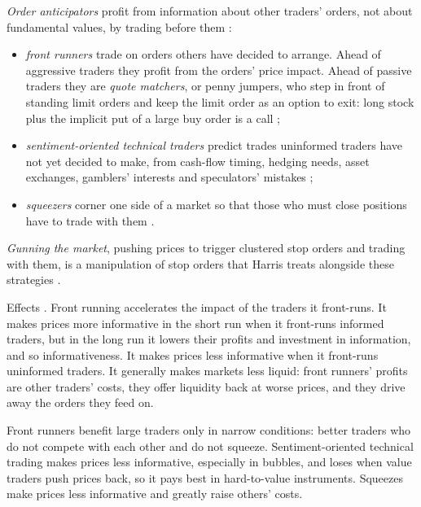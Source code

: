 \begin{qfdefinition}\label{def:order-anticipation}
 \emph{Order anticipators} profit from information about other traders' orders, not about fundamental values, by trading before them \citep[chap.~``Order Anticipators'', pp.~245 and~256--257]{alpha-harris}:
\begin{itemize}
\item \emph{front runners} trade on orders others have decided to arrange. Ahead of aggressive traders they profit from the orders' price impact. Ahead of passive traders they are \emph{quote matchers}, or penny jumpers, who step in front of standing limit orders and keep the limit order as an option to exit: long stock plus the implicit put of a large buy order is a call \citep[sec.~11.1, pp.~245--250]{alpha-harris};
\item \emph{sentiment-oriented technical traders} predict trades uninformed traders have not yet decided to make, from cash-flow timing, hedging needs, asset exchanges, gamblers' interests and speculators' mistakes \citep[sec.~11.2, pp.~251--254]{alpha-harris};
\item \emph{squeezers} corner one side of a market so that those who must close positions have to trade with them \citep[sec.~11.3, pp.~254--256]{alpha-harris}.
\end{itemize}
\emph{Gunning the market}, pushing prices to trigger clustered stop orders and trading with them, is a manipulation of stop orders that Harris treats alongside these strategies \citep[sec.~11.4, p.~256]{alpha-harris}.

 Effects \citep[same chap., secs.~11.1.3--11.1.4, 11.2.1 and~11.3, pp.~250--256]{alpha-harris}. Front running accelerates the impact of the traders it front-runs. It makes prices more informative in the short run when it front-runs informed traders, but in the long run it lowers their profits and investment in information, and so informativeness. It makes prices less informative when it front-runs uninformed traders. It generally makes markets less liquid: front runners' profits are other traders' costs, they offer liquidity back at worse prices, and they drive away the orders they feed on.

Front runners benefit large traders only in narrow conditions: better traders who do not compete with each other and do not squeeze. Sentiment-oriented technical trading makes prices less informative, especially in bubbles, and loses when value traders push prices back, so it pays best in hard-to-value instruments. Squeezes make prices less informative and greatly raise others' costs.


\end{qfdefinition}
